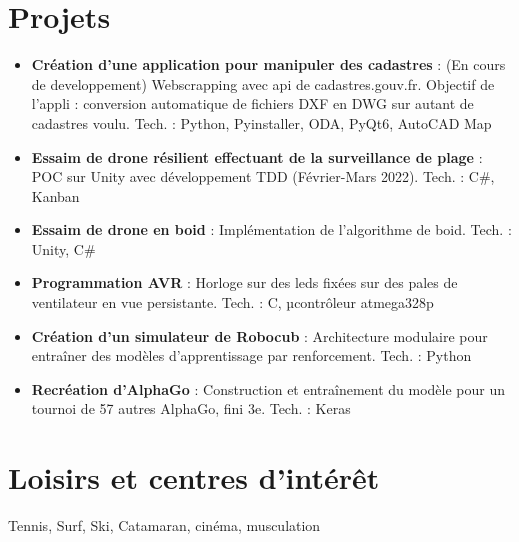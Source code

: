 \documentclass[a4paper]{article}
\newcommand{\cvitem}[2]{
	\item{
		\textbf{#1}{ : #2 } 
	}
}
\newcommand{\cvsubitem}[2] {\cvitem{#1}{#2} 
}
\begin{document}
\section{Projets}
	\begin{itemize}[leftmargin=*]
		\cvsubitem{Création d'une application pour manipuler des cadastres}
{(En cours de developpement) Webscrapping avec api de cadastres.gouv.fr. Objectif de l'appli : conversion automatique de fichiers DXF en DWG sur autant de cadastres voulu. Tech. : Python, Pyinstaller, ODA, PyQt6, AutoCAD Map}
		\cvsubitem{Essaim de drone résilient effectuant de la surveillance de plage}{POC sur Unity avec développement TDD (Février-Mars 2022). Tech. : C\#, Kanban}
		\cvsubitem{Essaim de drone en boid}{Implémentation de l'algorithme de boid. Tech. : Unity, C\#}
		\cvsubitem{Programmation AVR}{Horloge sur des leds fixées sur des pales de ventilateur en vue persistante. Tech. : C, µcontrôleur atmega328p}
		\cvsubitem{Création d'un simulateur de Robocub}{Architecture modulaire pour entraîner des modèles d'apprentissage par renforcement. Tech. : Python}
		\cvsubitem{Recréation d'AlphaGo}{Construction et entraînement du modèle pour un tournoi de 57 autres AlphaGo, fini 3e. Tech. : Keras}
	\end{itemize}


\section{Loisirs et centres d'intérêt}

Tennis, Surf, Ski, Catamaran, cinéma, musculation
\end{document}
